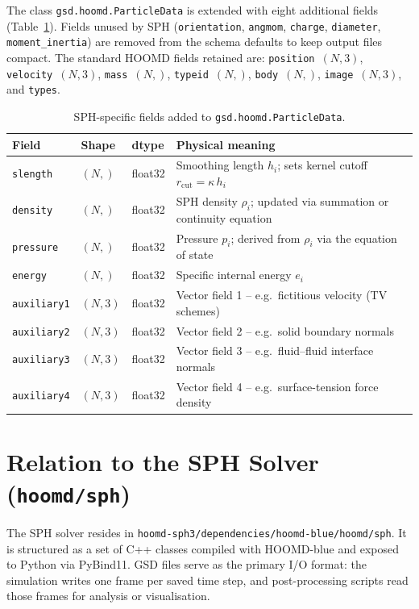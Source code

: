 \documentclass[10pt,a4paper]{article}
\begin{document}
The class \texttt{gsd.hoomd.ParticleData} is extended with eight additional
fields (Table~\ref{tab:fields}).  Fields unused by SPH (\texttt{orientation},
\texttt{angmom}, \texttt{charge}, \texttt{diameter}, \texttt{moment\_inertia})
are removed from the schema defaults to keep output files compact.
The standard HOOMD fields retained are: \texttt{position}~$(N,3)$,
\texttt{velocity}~$(N,3)$, \texttt{mass}~$(N,)$, \texttt{typeid}~$(N,)$,
\texttt{body}~$(N,)$, \texttt{image}~$(N,3)$, and \texttt{types}.

\begin{table}[h]
\centering
\caption{SPH-specific fields added to \texttt{gsd.hoomd.ParticleData}.}
\label{tab:fields}
\small
\begin{tabular}{@{}lllp{7.5cm}@{}}
\toprule
\textbf{Field} & \textbf{Shape} & \textbf{dtype} & \textbf{Physical meaning}\\
\midrule
\texttt{slength}    & $(N,)$   & float32 & Smoothing length $h_i$; sets kernel cutoff $r_\mathrm{cut} = \kappa\,h_i$\\
\texttt{density}    & $(N,)$   & float32 & SPH density $\rho_i$; updated via summation or continuity equation\\
\texttt{pressure}   & $(N,)$   & float32 & Pressure $p_i$; derived from $\rho_i$ via the equation of state\\
\texttt{energy}     & $(N,)$   & float32 & Specific internal energy $e_i$\\
\texttt{auxiliary1} & $(N, 3)$ & float32 & Vector field 1 -- e.g.\ fictitious velocity (TV schemes)\\
\texttt{auxiliary2} & $(N, 3)$ & float32 & Vector field 2 -- e.g.\ solid boundary normals\\
\texttt{auxiliary3} & $(N, 3)$ & float32 & Vector field 3 -- e.g.\ fluid--fluid interface normals\\
\texttt{auxiliary4} & $(N, 3)$ & float32 & Vector field 4 -- e.g.\ surface-tension force density\\
\bottomrule
\end{tabular}
\end{table}

\section{Relation to the SPH Solver (\texttt{hoomd/sph})}

The SPH solver resides in
\texttt{hoomd-sph3/dependencies/hoomd-blue/hoomd/sph}.
It is structured as a set of C++ classes compiled with HOOMD-blue and exposed
to Python via PyBind11.  GSD files serve as the primary I/O format: the
simulation writes one frame per saved time step, and post-processing scripts
read those frames for analysis or visualisation.
\end{document}
